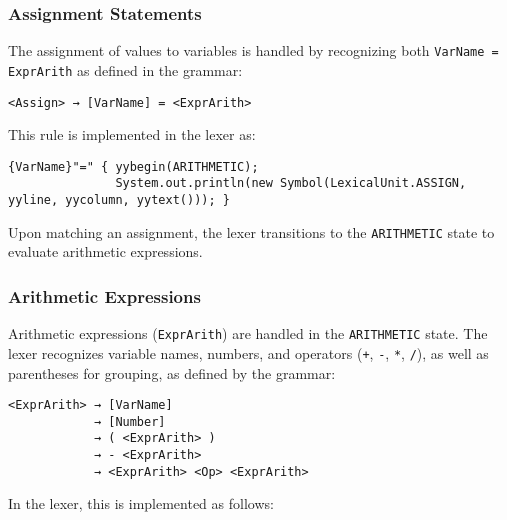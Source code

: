 \documentclass{article}
\begin{document}
	\subsubsection{Assignment Statements}
	The assignment of values to variables is handled by recognizing both \texttt{VarName = ExprArith} as defined in the grammar:

	\begin{verbatim}
<Assign> → [VarName] = <ExprArith>
	\end{verbatim}

	This rule is implemented in the lexer as:

	\begin{verbatim}
{VarName}"=" { yybegin(ARITHMETIC);
               System.out.println(new Symbol(LexicalUnit.ASSIGN, yyline, yycolumn, yytext())); }
	\end{verbatim}

	Upon matching an assignment, the lexer transitions to the \texttt{ARITHMETIC} state to evaluate arithmetic expressions.

	\subsubsection{Arithmetic Expressions}
	Arithmetic expressions (\texttt{ExprArith}) are handled in the \texttt{ARITHMETIC} state. The lexer recognizes variable names, numbers, and operators (\texttt{+}, \texttt{-}, \texttt{*}, \texttt{/}), as well as parentheses for grouping, as defined by the grammar:

	\begin{verbatim}
<ExprArith> → [VarName]
			→ [Number]
			→ ( <ExprArith> )
			→ - <ExprArith>
			→ <ExprArith> <Op> <ExprArith>
	\end{verbatim}

	In the lexer, this is implemented as follows:
\end{document}
